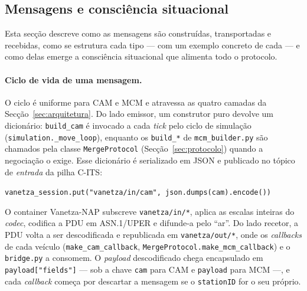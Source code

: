 \documentclass[11pt,a4paper]{article}
\begin{document}
\subsection{Mensagens e consciência situacional}
\label{sec:mensagens}

Esta secção descreve como as mensagens são construídas, transportadas e recebidas, como se
estrutura cada tipo --- com um exemplo concreto de cada --- e como delas emerge a
consciência situacional que alimenta todo o protocolo.

\paragraph{Ciclo de vida de uma mensagem.} O ciclo é uniforme para CAM e MCM e atravessa as
quatro camadas da Secção~\ref{sec:arquitetura}. Do lado emissor, um construtor puro devolve
um dicionário: \texttt{build\_cam} é invocado a cada \emph{tick} pelo ciclo de simulação
(\texttt{simulation.\_move\_loop}), enquanto os \texttt{build\_*} de \texttt{mcm\_builder.py}
são chamados pela classe \texttt{MergeProtocol} (Secção~\ref{sec:protocolo}) quando a
negociação o exige. Esse dicionário é serializado em JSON e publicado no tópico de
\emph{entrada} da pilha C-ITS:
\begin{center}
\texttt{vanetza\_session.put("vanetza/in/cam", json.dumps(cam).encode())}
\end{center}
O container Vanetza-NAP subscreve \texttt{vanetza/in/*}, aplica as escalas inteiras do
\emph{codec}, codifica a PDU em ASN.1/UPER e difunde-a pelo ``ar''. Do lado recetor, a PDU
volta a ser descodificada e republicada em \texttt{vanetza/out/*}, onde os \emph{callbacks}
de cada veículo (\texttt{make\_cam\_callback}, \texttt{MergeProtocol.make\_mcm\_callback})
e o \texttt{bridge.py} a consomem. O \emph{payload} descodificado chega encapsulado em
\texttt{payload["fields"]} --- sob a chave \texttt{cam} para CAM e \texttt{payload} para
MCM ---, e cada \emph{callback} começa por descartar a mensagem se o \texttt{stationID} for
o seu próprio.
\end{document}
